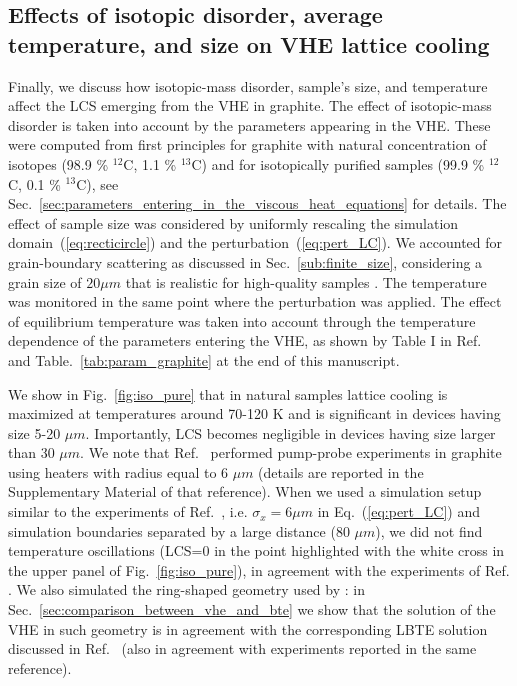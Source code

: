 \documentclass[
prb,
twocolumn,
superscriptaddress,
 amsmath,amssymb,
 aps,
longbibliography,
]{revtex4-2}
\begin{document}
\subsection{Effects of isotopic disorder, average temperature, and size on VHE lattice cooling}
\label{sec:LCS_iso_temp_size}
Finally, we discuss how isotopic-mass disorder, sample's size, and temperature affect the LCS emerging from the VHE in graphite.
The effect of isotopic-mass disorder is taken into account by the parameters appearing in the VHE. These were computed from first principles for graphite with natural concentration of isotopes (98.9 \% $^{12}$C, 1.1 \% $^{13}$C) and for isotopically purified samples (99.9 \% $^{12}$C, 0.1 \% $^{13}$C), see Sec.~\ref{sec:parameters_entering_in_the_viscous_heat_equations} for details.
The effect of sample size was considered by uniformly rescaling the simulation domain~(\ref{eq:recticircle}) and the perturbation~(\ref{eq:pert_LC}). We accounted for grain-boundary scattering as discussed in Sec.~\ref{sub:finite_size}, considering a grain size of $20 \mu m$ that is realistic for high-quality samples \cite{Jeong2021,Ding2022}.
The temperature was monitored in the same point where the perturbation was applied.
The effect of equilibrium temperature was taken into account through the temperature dependence of the parameters entering the VHE, as shown by Table I in Ref.~\cite{Simoncelli2020} and Table.~\ref{tab:param_graphite} at the end of this manuscript.

We show in Fig.~\ref{fig:iso_pure} that in natural samples lattice cooling is maximized at temperatures around 70-120 K and is significant in devices having size 5-20 $\mu m$. Importantly, LCS becomes negligible in devices having size larger than 30 $\mu m$.
We note that Ref.~\cite{Jeong2021} performed pump-probe experiments in graphite using heaters with radius equal to 6 $\mu m$ (details are reported in the Supplementary Material of that reference).
When we used a simulation setup similar to the experiments of Ref.~\cite{Jeong2021}, i.e. $\sigma_x=6 \mu m$ in Eq.~(\ref{eq:pert_LC}) and simulation boundaries separated by a large distance (80 $\mu m$), we did not find temperature oscillations (LCS=0 in the point highlighted with the white cross in the upper panel of Fig.~\ref{fig:iso_pure}), in agreement with the experiments of Ref. \cite{Jeong2021}.
We also simulated the ring-shaped geometry used by \citet{Jeong2021}: in Sec.~\ref{sec:comparison_between_vhe_and_bte} we show that the solution of the VHE in such geometry is in agreement with the corresponding LBTE solution discussed in Ref.~\cite{Jeong2021} (also in agreement with experiments reported in the same reference).
\end{document}
